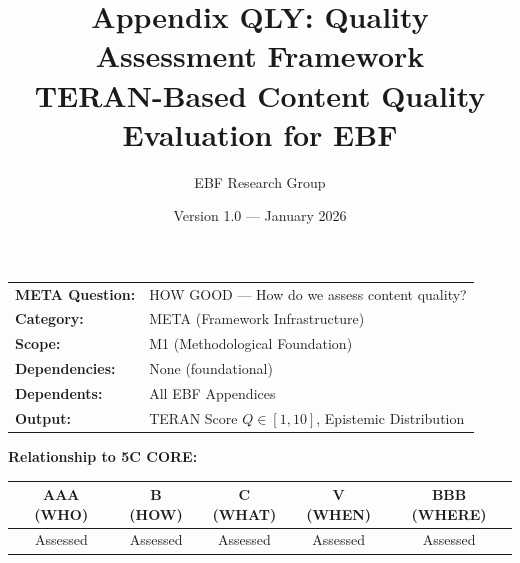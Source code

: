 \documentclass[11pt,a4paper]{article}
\title{\textbf{Appendix QLY: Quality Assessment Framework}\\
\large TERAN-Based Content Quality Evaluation for EBF}
\author{EBF Research Group}
\date{Version 1.0 — January 2026}
\begin{document}
\maketitle


\begin{tcolorbox}[colback=blue!5,colframe=blue!75!black,title=\textbf{Header Block}]
\begin{tabular}{p{4cm}p{10cm}}
\textbf{META Question:} & HOW GOOD — How do we assess content quality? \\
\textbf{Category:} & META (Framework Infrastructure) \\
\textbf{Scope:} & M1 (Methodological Foundation) \\
\textbf{Dependencies:} & None (foundational) \\
\textbf{Dependents:} & All EBF Appendices \\
\textbf{Output:} & TERAN Score $Q \in [1, 10]$, Epistemic Distribution \\
\end{tabular}

\vspace{0.3cm}
\textbf{Relationship to 5C CORE:}
\begin{center}
\begin{tabular}{|c|c|c|c|c|}
\hline
\textbf{AAA (WHO)} & \textbf{B (HOW)} & \textbf{C (WHAT)} & \textbf{V (WHEN)} & \textbf{BBB (WHERE)} \\
\hline
Assessed & Assessed & Assessed & Assessed & Assessed \\
\hline
\end{tabular}
\end{center}
\end{tcolorbox}

\end{document}

